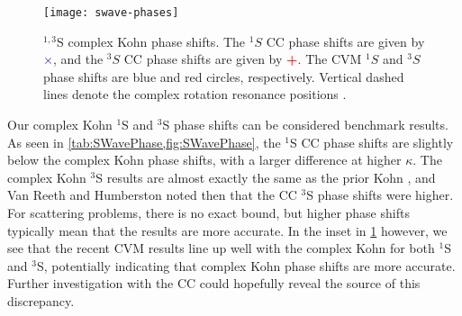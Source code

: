 \documentclass[Dissertation.tex]{subfiles}
\begin{document}
\begin{figure}[H]
	\centering
	\texttt{[image: swave-phases]}
	\caption[$^{1,3}$S complex Kohn phase shifts]{$^{1,3}$S complex Kohn phase shifts. The $^1S$ CC phase shifts
\cite{Walters2004} are given by \mbox{\textcolor{blue}{$\times$}}, and the
$^3S$ CC phase shifts \cite{Blackwood2002} are given by
\mbox{\textcolor{red}{\textbf{+}}}. The CVM $^1S$ and $^3S$ phase shifts
\cite{Zhang2012} are blue and red circles,
respectively. Vertical dashed lines denote the complex rotation resonance
positions \cite{Yan1999,Yan1998a,Ho1998}.}
	\label{fig:SWavePhase}
\end{figure}

Our complex Kohn $^1$S and $^3$S phase shifts can be considered benchmark results. As seen in \cref{tab:SWavePhase,fig:SWavePhase}, the $^1$S CC phase shifts are slightly below the complex Kohn phase shifts, with a larger difference at higher $\kappa$. The complex Kohn $^3$S results are almost exactly the same as the prior Kohn \cite{VanReeth2003}, and Van Reeth and Humberston noted then that the CC $^3$S phase shifts were higher. For scattering problems, there is no exact bound, but higher phase shifts typically mean that the results are more accurate. In the inset in \cref{fig:SWavePhase} however, we see that the recent CVM results line up well with the complex Kohn for both $^1$S and $^3$S, potentially indicating that complex Kohn phase shifts are more accurate. Further investigation with the CC could hopefully reveal the source of this discrepancy.
\end{document}
